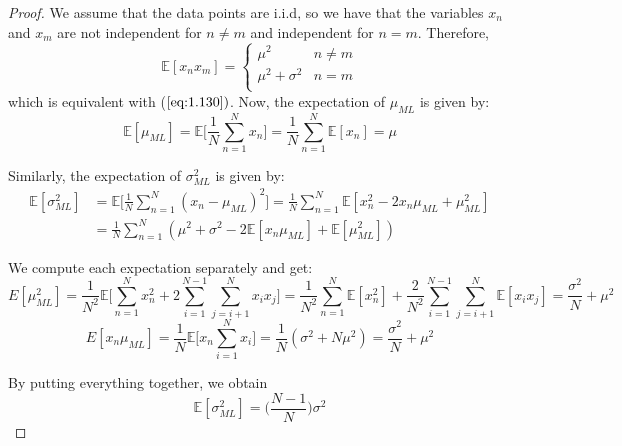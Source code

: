 \vspace{1em}

\begin{proof}
    We assume that the data points are i.i.d, so we have that the variables
    $x_n$ and $x_m$ are not independent for $n \neq m$ and independent for $n = m$.
    Therefore,  
    \[
        \mathbb{E}[x_nx_m] = 
        \begin{cases}
            \mu^2 & n \neq m \\
            \mu^2 + \sigma^2 & n = m \\

        \end{cases}
    \] 
    which is equivalent with ($\ref{eq:1.130})$.
    Now, the expectation of $\mu_{ML}$ is given by:
    \begin{equation*}
         \mathbb{E}[\mu_{ML}] 
         = \mathbb{E} \bigg[\frac{1}{N} \sum_{n=1}^{N} x_n\bigg]
         = \frac{1}{N} \sum_{n=1}^{N} \mathbb{E}[x_n] = \mu
        \tag{1.57}\label{eq:1.57}
    \end{equation*}

    Similarly, the expectation of $\sigma_{ML}^2$ is given by: 
    \begin{align*}
        \mathbb{E}[\sigma_{ML}^2] 
        &= \mathbb{E}\bigg[\frac{1}{N} \sum_{n=1}^{N} (x_n - \mu_{ML})^2\bigg]
        = \frac{1}{N} \sum_{n=1}^{N} \mathbb{E} [x_n^2 - 2x_n\mu_{ML} + \mu_{ML}^2] \\
        &= \frac{1}{N} \sum_{n=1}^{N} (\mu^2 + \sigma^2 - 2\mathbb{E}[x_n\mu_{ML}] + \mathbb{E}[\mu_{ML}^2])
    \end{align*}

    We compute each expectation separately and get:
    \[
    E[\mu_{ML}^2]
    = \frac{1}{N^2} \mathbb{E} \bigg[\sum_{n=1}^{N} x_n^2 + 2\sum_{i=1}^{N-1} \sum_{j=i+1}^{N} x_ix_j\bigg]
    = \frac{1}{N^2} \sum_{n=1}^{N} \mathbb{E}[x_n^2] + 
        \frac{2}{N^2} \sum_{i=1}^{N-1} \sum_{j = i+1}^{N} \mathbb{E}[x_ix_j]
    = \frac{\sigma^2}{N} + \mu^2
    \] 
    \[
        E[x_n\mu_{ML}] = \frac{1}{N} \mathbb{E}\bigg[x_n \sum_{i=1}^{N} x_i\bigg]
        = \frac{1}{N} (\sigma^2 + N\mu^2) = \frac{\sigma^2}{N} + \mu^2
    \]

    By putting everything together, we obtain
    \begin{equation*}
        \mathbb{E}[\sigma_{ML}^2] = \bigg(\frac{N - 1}{N}\bigg) \sigma^2
        \tag{1.58}\label{eq:1.58}
    \end{equation*}
\end{proof}

